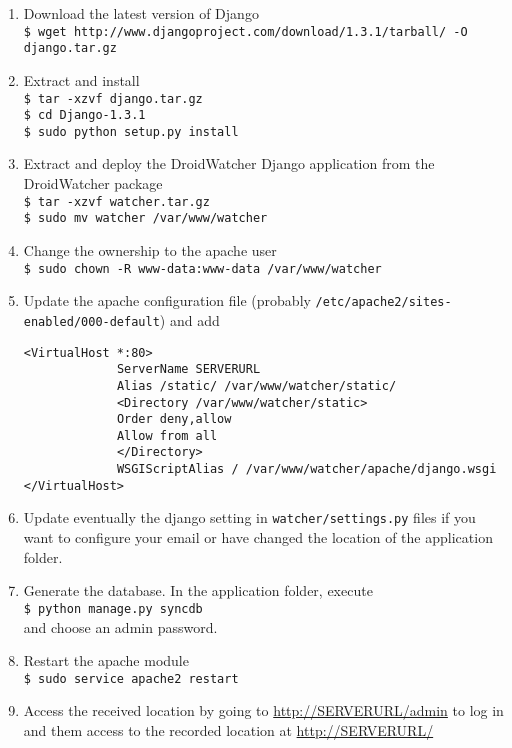 \begin{enumerate}
\item Download the latest version of Django\\
  \texttt{\$ wget http://www.djangoproject.com/download/1.3.1/tarball/ -O django.tar.gz}
\item Extract and install\\
  \texttt{\$ tar -xzvf django.tar.gz\\\$ cd Django-1.3.1\\\$ sudo python setup.py install}
\item Extract and deploy the DroidWatcher Django application from the DroidWatcher package\\
  \texttt{\$ tar -xzvf watcher.tar.gz\\\$ sudo mv watcher /var/www/watcher}
\item Change the ownership to the apache user\\
  \texttt{\$ sudo chown -R www-data:www-data /var/www/watcher}
\item Update the apache configuration file (probably \texttt{/etc/apache2/sites-enabled/000-default}) and add
\begin{verbatim}
<VirtualHost *:80>
             ServerName SERVERURL
             Alias /static/ /var/www/watcher/static/
             <Directory /var/www/watcher/static>
             Order deny,allow
             Allow from all
             </Directory>
             WSGIScriptAlias / /var/www/watcher/apache/django.wsgi
</VirtualHost>
\end{verbatim}
\item Update eventually the django setting in \texttt{watcher/settings.py} files if you want to configure your email or have changed the location of the application folder.
\item Generate the database. In the application folder, execute\\
  \texttt{\$ python manage.py syncdb}\\
  and choose an admin password.
\item Restart the apache module\\
  \texttt{\$ sudo service apache2 restart}
\item Access the received location by going to \url{http://SERVERURL/admin} to log in and them access to the recorded location at \url{http://SERVERURL/}
\end{enumerate}
